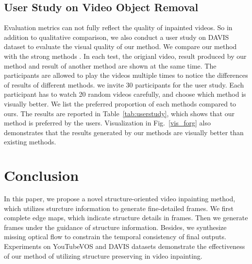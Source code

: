 \subsection{User Study on Video Object Removal}
Evaluation metrics can not fully reflect the quality of inpainted videos. So in addition to qualitative comparison, we also conduct a user study on DAVIS dataset to evaluate the visual quality of our method. We compare our method with the strong methods \cite{nazeri2019edgeconnect,wang2019video,Kim_2019_CVPR1,Xu_2019_CVPR}.
In each test, the origianl video, result produced by our method and result of another method are shown at the same time. The participants are allowed to play the videos multiple times to notice the differences of results of different methods.
we invite 30 participants for the user study. Each participant has to watch 20 random videos carefully, and choose which method is visually better. We list the preferred proportion of each methods compared to ours. The results are reported in Table~\ref{tab:userstudy}, which shows that our method is preferred by the users. Visualization in Fig.~\ref{vis_forg} also demonstrates that the results generated by our methods are visually better than existing methods.
\begin{table}[t]
	\caption{The result of user study.}\smallskip
	\tiny
	\centering
	\label{tab:userstudy}
\end{table}






\section{Conclusion}
In this paper, we propose a novel structure-oriented video inpainting method, which utilizes sturcture information to generate fine-detailed frames. We first complete edge maps, which indicate structure details in frames. Then we generate frames under the guidance of structure information. Besides, we synthesize missing optical flow to constrain the temporal consistency of final outputs.
Experiments on YouTubeVOS and DAVIS datasets demonstrate the effectiveness of our method of utilizing structure preserving in video inpainting.


